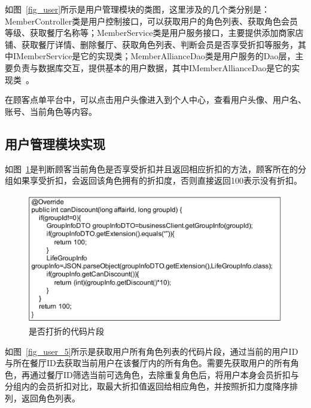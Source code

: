 如图~\ref{fig_user}所示是用户管理模块的类图，这里涉及的几个类分别是：MemberController类是用户控制接口，可以获取用户的角色列表、获取角色会员等级、获取餐厅名称等；MemberService类是用户服务接口，主要提供添加商家店铺、获取餐厅详情、删除餐厅、获取角色列表、判断会员是否享受折扣等服务，其中IMemberService是它的实现类；MemberAllianceDao类是用户服务的Dao层，主要负责与数据库交互，提供基本的用户数据，其中IMemberAllianceDao是它的实现类~\cite{zzz2019}。

在顾客点单平台中，可以点击用户头像进入到个人中心，查看用户头像、用户名、账号、当前角色等内容。
\\

\subsection{用户管理模块实现}
如图~\ref{fig_user_4}是判断顾客当前角色是否享受折扣并且返回相应折扣的方法，顾客所在的分组如果享受折扣，会返回该角色拥有的折扣度，否则直接返回100表示没有折扣。

\begin{figure}[htbp!]
    \centering
    \includegraphics[width=4.4in]{FIGs/chapter4/4.pdf}
    \caption{是否打折的代码片段}\label{fig_user_4}
\end{figure}

如图~\ref{fig_user_5}所示是获取用户所有角色列表的代码片段，通过当前的用户ID与所在餐厅ID去获取当前用户在该餐厅内的所有角色。需要先获取用户的所有角色，再通过餐厅ID筛选当前可选角色，去除重复角色后，将用户本身会员折扣与分组内的会员折扣对比，取最大折扣值返回给相应角色，并按照折扣力度降序排列，返回角色列表。

